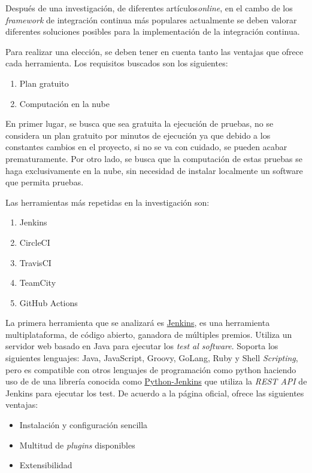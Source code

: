 Después de una investigación, de diferentes artículos\emph{online}, en el cambo de los \emph{framework} de integración continua más populares actualmente se deben valorar diferentes soluciones posibles para la implementación de la integración continua. \cite{CIKumar2023}\cite{CITaylor2023}\cite{CIRoddewig2023}

Para realizar una elección, se deben tener en cuenta tanto las ventajas que ofrece cada herramienta. Los requisitos buscados son los siguientes:
\begin{enumerate}
    \item Plan gratuito
    \item Computación en la nube
\end{enumerate}

En primer lugar, se busca que sea gratuita la ejecución de pruebas, no se considera un plan gratuito por minutos de ejecución ya que debido a los constantes cambios en el proyecto, si no se va con cuidado, se pueden acabar prematuramente. Por otro lado, se busca que la computación de estas pruebas se haga exclusivamente en la nube, sin necesidad de instalar localmente un software que permita pruebas.

Las herramientas más repetidas en la investigación son:
\begin{enumerate}
    \item Jenkins
    \item CircleCI
    \item TravisCI
    \item TeamCity
    \item GitHub Actions
\end{enumerate}

La primera herramienta que se analizará es \href{https://www.jenkins.io/}{Jenkins}, es una herramienta multiplataforma, de código abierto, ganadora de múltiples premios. Utiliza un servidor web basado en Java para ejecutar los \emph{test al software}. Soporta los siguientes lenguajes: Java, JavaScript, Groovy, GoLang, Ruby y Shell \emph{Scripting}, pero es compatible con otros lenguajes de programación como \Gls{python} haciendo uso de de una librería conocida como \href{https://python-jenkins.readthedocs.io/en/latest/index.html}{Python-Jenkins} que utiliza la \emph{REST API} de Jenkins para ejecutar los test. De acuerdo a la página oficial, ofrece las siguientes ventajas: \cite{polkhovskiy2016comparison}
\begin{itemize}
    \item Instalación y configuración sencilla
    \item Multitud de \emph{plugins} disponibles
    \item Extensibilidad
\end{itemize}

